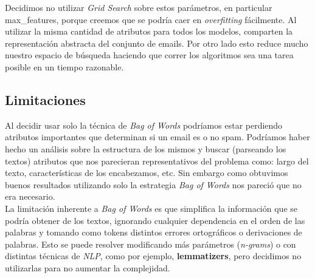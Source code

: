 Decidimos no utilizar \textit{Grid Search} sobre estos parámetros, en particular max\_features, porque creemos que se podría caer en \textit{overfitting} fácilmente. Al utilizar la misma cantidad de atributos para todos los modelos, comparten la representación abstracta del conjunto de emails. Por otro lado esto reduce mucho nuestro espacio de búsqueda haciendo que correr los algoritmos sea una tarea posible en un tiempo razonable.\\

\subsection{Limitaciones}
Al decidir usar solo la técnica de \textit{Bag of Words} podríamos estar perdiendo atributos importantes que determinan
si un email es o no spam. Podríamos haber hecho un análisis sobre la estructura de los mismos y buscar (parseando los textos)
atributos que nos parecieran representativos del problema como: largo del texto, características de los encabezamos, etc.
Sin embargo como obtuvimos buenos resultados utilizando solo la estrategia \textit{Bag of Words} nos pareció que no era necesario.   \\

La limitación inherente a \textit{Bag of Words} es que simplifica la información que se podría obtener de los textos,
ignorando cualquier dependencia en el orden de las palabras y tomando como tokens distintos errores ortográficos o derivaciones
de palabras. Esto se puede resolver modificando más parámetros (\textit{n-grams}) o con distintas técnicas de \textit{NLP},
como por ejemplo, \textbf{lemmatizers}, pero decidimos no utilizarlas para no aumentar la complejidad.
